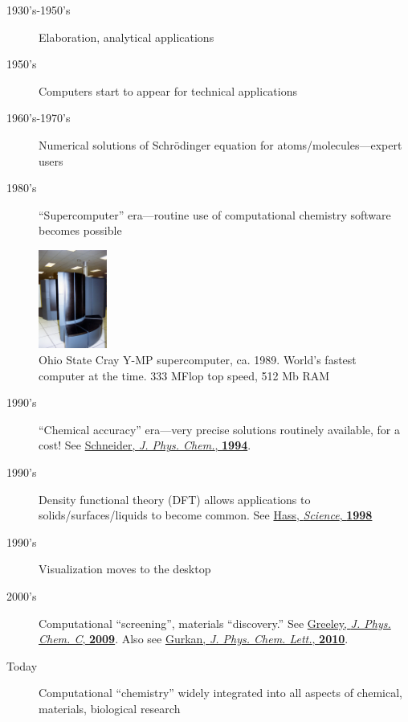 \documentclass[11pt]{article}
\begin{document}
\begin{description}
\item[{1930's-1950's}] Elaboration, analytical applications

\item[{1950's}] Computers start to appear for technical applications

\item[{1960's-1970's}] Numerical solutions of Schr\"{o}dinger equation for atoms/molecules---expert users

\item[{1980's}] ``Supercomputer'' era---routine use of computational chemistry software becomes possible
\end{description}
\begin{figure}[htbp]
\centering
\includegraphics[width=0.2\textwidth]{./Images/CrayYMPb.jpg}
\caption{Ohio State Cray Y-MP supercomputer, ca. 1989.  World's fastest computer at the time.  333 MFlop top speed, 512 Mb RAM}
\end{figure}

\begin{description}
\item[{1990's}] ``Chemical accuracy'' era---very precise solutions routinely available, for a cost!  See \href{http://www.crc.nd.edu/\~wschnei1/courses/CBE\_547/Resources/1994\_WFS\_JPC.pdf}{Schneider, \emph{J. Phys. Chem.}, \textbf{1994}}.

\item[{1990's}] Density functional theory (DFT) allows applications to solids/surfaces/liquids to become common. See \href{http://www.crc.nd.edu/\~wschnei1/courses/CBE\_547/Resources/1998\_Hass\_Science.pdf}{Hass, \emph{Science}, \textbf{1998}}

\item[{1990's}] Visualization moves to the desktop

\item[{2000's}] Computational ``screening'', materials ``discovery.'' See \href{http://www.crc.nd.edu/\~wschnei1/courses/CBE\_547/Resources/2009\_Greeley\_JPCC.pdf}{Greeley, \emph{J. Phys. Chem. C}, \textbf{2009}}.  Also see \href{http://www.crc.nd.edu/\~wschnei1/courses/CBE\_547/Resources/2010\_Gurkan\_JPCL.pdf}{Gurkan, \emph{J. Phys. Chem. Lett.}, \textbf{2010}}.

\item[{Today}] Computational ``chemistry'' widely integrated into all aspects of chemical, materials, biological research
\end{description}
\end{document}
